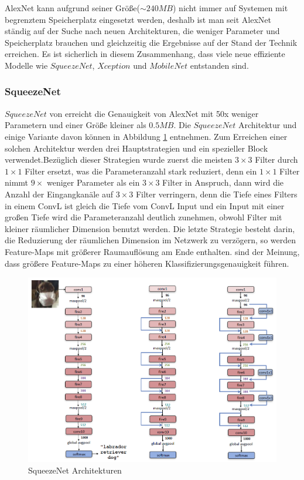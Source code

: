 \documentclass[12pt,a4paper]{scrartcl}
\numberwithin{equation}{section}
\begin{document}
AlexNet kann aufgrund seiner Größe($\sim240MB$) nicht immer auf Systemen mit begrenztem Speicherplatz eingesetzt werden, deshalb ist man seit AlexNet ständig auf der Suche nach neuen Architekturen, die weniger Parameter und Speicherplatz brauchen und  gleichzeitig die Ergebnisse auf der Stand der Technik erreichen. Es ist sicherlich  in diesem Zusammenhang, dass viele neue effiziente Modelle wie $ SqueezeNet $, $ Xception $ und $ MobileNet $ entstanden sind.\\


\subsubsection{SqueezeNet}
$ SqueezeNet $ von \cite[Song Han et al]{SqueezeNet} erreicht die Genauigkeit von AlexNet mit 50x weniger Parametern und  einer Größe kleiner als $ 0.5MB$. Die $ SqueezeNet $ Architektur und einige Variante davon können in Abbildung \ref{fig:SqueezeNet} entnehmen. Zum Erreichen einer solchen Architektur werden drei Hauptstrategien und ein spezieller Block verwendet.Bezüglich dieser Strategien wurde zuerst die meisten $ 3\times3 $ Filter durch $ 1\times1 $ Filter ersetzt, was die Parameteranzahl stark reduziert, denn ein $ 1\times1 $ Filter nimmt $ 9\times $ weniger Parameter als ein $ 3\times3 $ Filter in Anspruch, dann wird die Anzahl der Eingangkanäle auf $ 3\times3 $ Filter verringern, denn die Tiefe eines Filters in einem \ac{ConvL} ist gleich die Tiefe vom \ac{ConvL} Input und ein Input mit einer großen Tiefe wird die Parameteranzahl deutlich zunehmen, obwohl Filter mit kleiner räumlicher Dimension benutzt werden. Die letzte Strategie besteht darin, die Reduzierung der räumlichen Dimension im Netzwerk zu verzögern, so werden Feature-Maps mit größerer Raumauflösung am Ende enthalten. \cite[Song Han et al]{SqueezeNet} sind der Meinung, dass größere Feature-Maps zu einer höheren Klassifizierungsgenauigkeit führen. 

\begin{figure}[h]
	\centering
	\includegraphics[width=\textwidth ]{squeezenet}
	\caption{ SqueezeNet Architekturen \cite{SqueezeNet} }
	\label{fig:SqueezeNet}
\end{figure}
\end{document}
